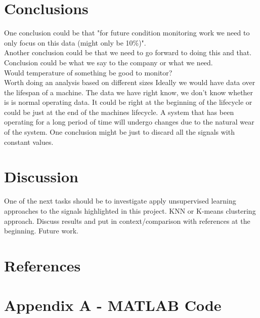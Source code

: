 \documentclass{article}
\begin{document}
\section{Conclusions}
One conclusion could be that "for future condition monitoring work we need to only focus on this data (might only be 10\%)".\\
Another conclusion could be that we need to go forward to doing this and that.\\
Conclusion could be what we say to the company or what we need.\\
Would temperature of something be good to monitor?\\
Worth doing an analysis based on different sizes
Ideally we would have data over the lifespan of a machine. The data we have right know, we don't know whether is is normal operating data. It could be right at the beginning of the lifecycle or could be just at the end of the machines lifecycle. A system that has been operating for a long period of time will undergo changes due to the natural wear of the system.
One conclusion might be just to discard all the signals with constant values.
\newpage
\section{Discussion} 
One of the next tasks should be to investigate apply unsupervised learning approaches to the signals highlighted in this project.
KNN or
K-means clustering approach.
Discuss results and put in context/comparison with references at the beginning. Future work.
\clearpage
\section{References} 
\printbibliography[heading=none] 
\clearpage  
\section{Appendix A - MATLAB Code}
\UseRawInputEncoding


\end{document}
